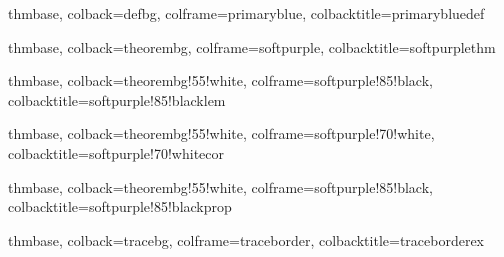 %
%


%
  {thmbase, colback=defbg, colframe=primaryblue, colbacktitle=primaryblue}{def}

%
  {thmbase, colback=theorembg, colframe=softpurple, colbacktitle=softpurple}{thm}

%
  {thmbase, colback=theorembg!55!white, colframe=softpurple!85!black,
   colbacktitle=softpurple!85!black}{lem}

%
  {thmbase, colback=theorembg!55!white, colframe=softpurple!70!white,
   colbacktitle=softpurple!70!white}{cor}

%
  {thmbase, colback=theorembg!55!white, colframe=softpurple!85!black,
   colbacktitle=softpurple!85!black}{prop}

%
  {thmbase, colback=tracebg, colframe=traceborder, colbacktitle=traceborder}{ex}
